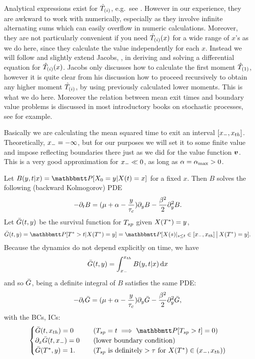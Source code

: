 Analytical expressions exist for ${ \hat{T}_{(i)} }$, e.g.\ see \cite{Inoue1995}.
However in our experience, they are awkward to work with numerically, especially
as they involve infinite alternating sums which can easily overflow in numeric
calculations. Moreover, they are not particularly convenient if you need ${ \hat{T}_{(i)} }
(x)$ for a wide range of $x$'s as we do here, since they calculate the value
independently for each $x$. Instead we will follow and slightly extend
Jacobs, \cite{Jacobs}, in deriving and solving a differential equation for
${ \hat{T}_{(i)} }(x)$.
Jacobs only discusses how to calculate the first moment
${ \hat{T}_{(1)} }$, however it is quite clear from his discussion how to proceed
recursively to obtain any higher moment ${ \hat{T}_{(i)} }$, by using previously calculated
lower moments. This is what we do here. Moreover the relation between mean exit
times and boundary value problems is discussed in most
introductory books on stochastic processes, see \cite{Oksendal2007} for
example.

Basically we are calculating the mean squared time to exit an interval $[{ x_{-} },
{ x_{th} }]$. Theoretically, ${ x_{-} } = -\infty$, but for our purposes we will set it to
some finite value and impose reflecting boundaries there just as we did for the
value function ${ \boldsymbol{v} }$. This is a very good approximation for ${ x_{-} } \ll 0$, as
long as $\alpha = { \alpha_{\textrm{max}} } >0$.

Let $B(y,t|x) = \Prob[X_0 = y| X(t) = x]$ for a fixed $x$. Then $B$ solves the
following (backward Kolmogorov) PDE
\begin{equation}
-{\partial}_t B = ({\mu } + \alpha - \frac y{\tau_c}){\partial}_yB - \frac {\beta^2} 2 {\partial}_y^2 B.
\label{eq:backward_Xdensity}
\end{equation}
Let ${ \bar{G} }(t,y)$ be the survival function for $T_{sp}$ given $X({ T^* }) = y$,
$$\G(t,y) = \Prob[\T>t | X(\T) = y] = \Prob[X(s)|_{s \leq t} \in [\xmin,
\xth] \,\big|\, X(\T) = y].$$
Because the dynamics do not depend explicitly on time, we have
$$
{ \bar{G} }(t,y) = \int_{ x_{-} }^{ x_{th} } B(y,t|x) \, \mathrm{d} x
$$
and so ${ \bar{G} }$, being a definite integral of $B$ satisfies the same PDE:
\begin{equation}
-{\partial}_t { \bar{G} } = ({\mu } + \alpha - \frac y{\tau_c}) {\partial}_y{ \bar{G} } - \frac {\beta^2} 2 {\partial}_y^2 { \bar{G} },
\label{eq:backward_SDF}
\end{equation}
with the BCs, ICs:
\begin{equation}
\begin{cases}
\G(t,\xth) = 0 & \quad (\ts = t \implies \Prob[\ts>t] = 0)
\\
\di_x \G(t,\xmin) = 0  & \quad (\textrm{lower boundary condition})
\\
\G(\T, y) = 1. & \quad (\ts \textrm{ is definitely} > \t \textrm{ for } X(\T)
\in (\xmin, \xth) )
\end{cases}
\end{equation}

